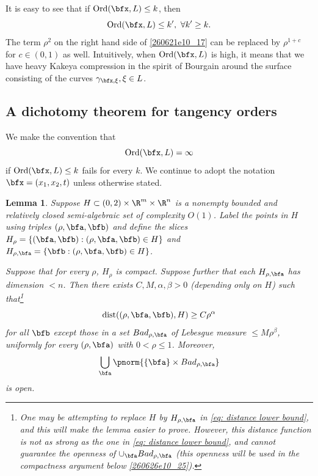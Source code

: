\documentclass{article}
\numberwithin{equation}{section}
\theoremstyle{plain}
\newtheorem{lemma}[theorem]{Lemma}
\begin{document}
It is easy to see that if $\mathrm{Ord}(\bfx, L)\le k$, then 
\begin{equation}
\mathrm{Ord}(\bfx, L)\le k', \ \forall k'\ge k.
\end{equation}
The term $\rho^2$ on the right hand side of \eqref{260621e10_17} can be replaced by $\rho^{1+c}$ for $c\in (0, 1)$ as well. Intuitively, when $\mathrm{Ord}(\bfx, L)$ is high, it means that we have heavy Kakeya compression in the spirit of Bourgain \cite{Bou91} around the surface consisting of the curves $\gamma_{\bfx, \xi}, \xi\in L$. 




\subsection{A dichotomy theorem for tangency orders}

We make the convention that 
\begin{equation}
\mathrm{Ord}(\bfx, L)=\infty
\end{equation}
if $\mathrm{Ord}(\bfx, L)\le k$ fails for every $k$. We continue to adopt the notation $\bfx=(x_1, x_2, t)$ unless otherwise stated. 



\begin{lemma}\label{volsliceslem}
    Suppose $H \subset (0, 2) \times \R^m\times \R^n$ is a nonempty bounded and relatively closed semi-algebraic set of complexity $O(1)$. Label the points in $H$ using triples $(\rho, \bfa, \bfb)$ and define the slices $H_{\rho} = \{(\bfa, \bfb): (\rho, \bfa, \bfb) \in H\}$ and $H_{\rho, \bfa} = \{\bfb: (\rho, \bfa, \bfb) \in H\}$.

    Suppose that for every $\rho$, $H_{\rho}$ is compact. Suppose further that each $H_{\rho, \bfa}$ has dimension $<n$. Then there exists $C, M, \alpha, \beta>0$ (depending only on $H$) such that\footnote{
    One may be attempting to replace $H$ by $H_{\rho, \bfa}$ in \eqref{eq: distance lower bound}, and this will make the lemma easier to prove. However, this distance function is not as strong as the one in \eqref{eq: distance lower bound}, and cannot guarantee the openness of $\cup_{\bfa} Bad_{\rho, \bfa}$ (this openness will be used in the compactness argument below \eqref{260626e10_25}). 
    }
    \begin{equation}\label{eq: distance lower bound}
        \text{dist} ((\rho, \bfa, \bfb), H)\geq C \rho^{\alpha}
    \end{equation}
    for all $\bfb$ except those in a set $Bad_{\rho, \bfa}$ of Lebesgue measure $\leq M \rho^{\beta}$, uniformly for every $(\rho, \bfa)$ with $0<\rho \leq 1$. Moreover,
    \begin{equation}
        \bigcup_{\bfa} \pnorm{
        \{\bfa\}\times Bad_{\rho, \bfa}
        }
    \end{equation}
    is open. 
\end{lemma}
\end{document}
